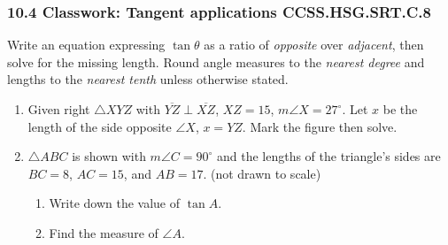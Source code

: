 \documentclass[12pt, twoside]{article}
\begin{document}
\subsubsection*{10.4 Classwork: Tangent applications \hfill CCSS.HSG.SRT.C.8}
Write an equation expressing $\tan \theta$ as a ratio of \emph{opposite} over \emph{adjacent}, then solve for the missing length. Round angle measures to the \emph{nearest degree} and lengths to the \emph{nearest tenth} unless otherwise stated.
\begin{enumerate}
\item Given right $\triangle XYZ$ with $\overline{YZ} \perp \overline{XZ}$, $XZ=15$, $m\angle X=27^\circ$. Let $x$ be the length of the side opposite $\angle X$, $x=YZ$. Mark the figure then solve.
    \begin{flushright}
      \end{flushright} \vspace{1.5cm}

\item $\triangle ABC$ is shown with $m\angle C=90^\circ$ and the lengths of the triangle's sides are $BC=8$, $AC=15$, and $AB=17$.  \hfill (not drawn to scale)
\begin{multicols}{2}
      \begin{enumerate}
      \item Write down the value of $\tan A$. \vspace{1.25cm}
      \item Find the measure of $\angle A$.  \vspace{1cm}
    \end{enumerate}
  \end{multicols} %


\end{enumerate}
\end{document}
